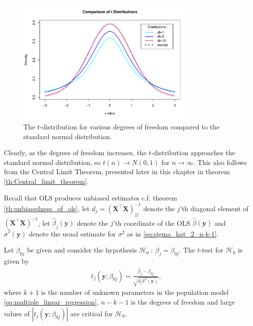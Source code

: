 \begin{figure}[H]
    \centering
    \includegraphics[width = 0.8\textwidth]{figures/t_distribution.pdf}
    \caption{The $t$-distribution for various degrees of freedom compared to the standard normal distribution.}
    \label{fig:t_distribution}
\end{figure}

Clearly, as the degrees of freedom increases, the $t$-distribution approaches the standard normal distribution, so $t(n) \rightarrow N(0,1)$ for $n\rightarrow \infty$. This also follows from the Central Limit Theorem, presented later in this chapter in theorem \ref{th:Central_limit_theorem}. 

Recall that OLS produces unbiased estimates c.f.$\!$ theorem \ref{th:unbiasedness_of_ols}, let $d_j=(\textbf{X}^\top\textbf{X})^{-1}_{jj}$ denote the $j$'th diagonal element of $(\textbf{X}^\top \textbf{X})^{-1}$, let $\hat{\beta}_j(\textbf{y})$ denote the $j$'th coordinate of the OLS $\hat{\beta}(\textbf{y})$ and $\hat{\sigma}^2(\textbf{y})$ denote the usual estimate for $\sigma^2$ as in \eqref{eq:sigma_hat_2_n-k-1}.

\begin{definition} [$t$-test] \label{def:t-test}
    Let $\beta_{0j}$ be given and consider the hypothesis $\mathcal{H}_0 \ : \ \beta_j=\beta_{0j}$. 
    The $t$-test for $\mathcal{H}_0$ is given by
\begin{align}\label{eq:t_test1}
   t_j(\textbf{y};\beta_{0j}) = \frac{\hat{\beta}_j - \beta_{0j}}{\sqrt{d_j\hat{\sigma}^2(\textbf{y})}}, 
\end{align}
where $k+1$ is the number of unknown parameters in the population model \eqref{eq:multiple_linear_regression}, $n-k-1$ is the degrees of freedom and large values of $|t_j(\textbf{y};\beta_{0j})|$ are critical for $\mathcal{H}_0$.
\end{definition}

